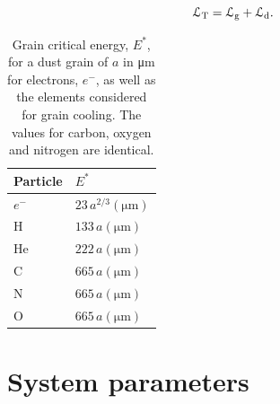 \begin{equation}
  \mathcal{L}_\text{T} = \mathcal{L}_\text{g} + \mathcal{L}_\text{d} .
\end{equation}

\begin{table}
  \centering
  \begin{tabular}{ll}
    \hline
    Particle & $E^*$ \\
    \hline
    $e^-$ & $23 \, a^{2/3}(\si{\micro\metre})$ \\
    H     & $133 \, a(\si{\micro\metre})$ \\
    He    & $222 \, a(\si{\micro\metre})$ \\
    C     & $665 \, a(\si{\micro\metre})$ \\
    N     & $665 \, a(\si{\micro\metre})$ \\
    O     & $665 \, a(\si{\micro\metre})$ \\
    \hline
  \end{tabular}
  \caption[Grain critical energy]{Grain critical energy, $E^*$, for a dust grain of $a$ in \si{\micro\metre} for electrons, $e^-$, as well as the elements considered for grain cooling. The values for carbon, oxygen and nitrogen are identical.}
  \label{tab:p2-criticalenergy}
\end{table}


\section{System parameters}
\label{sec:paper2-wr140}

